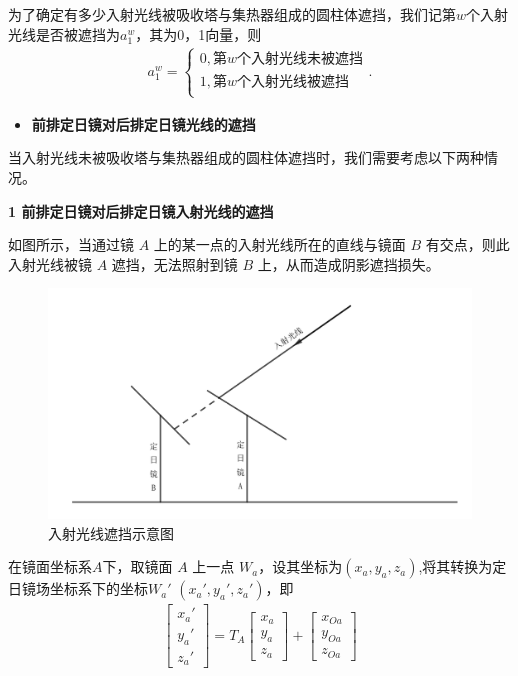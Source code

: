 \documentclass[../main.tex]{subfiles}
\begin{document}
\par 为了确定有多少入射光线被吸收塔与集热器组成的圆柱体遮挡，我们记第$w$个入射光线是否被遮挡为$a_1^w$，其为0，1向量，则
\begin{align}\label{1.28}
a_{1}^{w}=\begin{cases}
0,\text{第}w\text{个入射光线未被遮挡}\\
1,\text{第}w\text{个入射光线被遮挡}\\
\end{cases}.
\end{align}
\begin{itemize}
  \item \textbf{前排定日镜对后排定日镜光线的遮挡}
\end{itemize}
\par 当入射光线未被吸收塔与集热器组成的圆柱体遮挡时，我们需要考虑以下两种情况。
\par \textbf{1 前排定日镜对后排定日镜入射光线的遮挡}
\par 如图所示，当通过镜 \( A \) 上的某一点的入射光线所在的直线与镜面 \( B \) 有交点，则此入射光线被镜 \( A \) 遮挡，无法照射到镜 \( B \) 上，从而造成阴影遮挡损失。
\begin{figure}[H]
\centering
\includegraphics[width=.9\textwidth]{7}
\caption{入射光线遮挡示意图}
\label{1.29}
\end{figure}
\par 在镜面坐标系$A$下，取镜面 \( A \) 上一点 \( W_a\)，设其坐标为$(x_a,y_a,z_a)$,将其转换为定日镜场坐标系下的坐标\( W_a'\) \( (x_a', y_a', z_a') \)，即
\begin{align}\label{1.30}
 \begin{bmatrix}
x_a' \\
y_a' \\
z_a'
\end{bmatrix}
= T_{A} \begin{bmatrix}
x_a \\
y_a \\
z_a
\end{bmatrix}
+ \begin{bmatrix}
x_{Oa} \\
y_{Oa} \\
z_{Oa}
\end{bmatrix}
\end{align}
\end{document}
